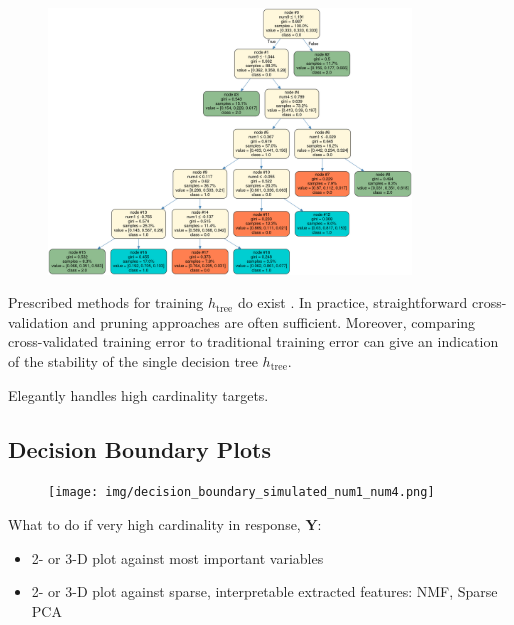 \documentclass{article}
\begin{document}
\begin{figure}[htb]
	\begin{center}
		\includegraphics[height=200pt]{img/simple_tree_prepruned_simulated.png}
		\caption{}
		\label{fig:surrogate_dt}
	\end{center}
\end{figure}

Prescribed methods for training $h_{\text{tree}}$ do exist \cite{dt_surrogate1} \cite{dt_surrogate2}. In practice, straightforward cross-validation and pruning approaches are often sufficient. Moreover, comparing cross-validated training error to traditional training error can give an indication of the stability of the single decision tree $h_{\text{tree}}$.

Elegantly handles high cardinality targets.

\subsection{Decision Boundary Plots}

\begin{figure}[htb]
	\begin{center}
		\texttt{[image: img/decision\_boundary\_simulated\_num1\_num4.png]}
		\caption{}
		\label{fig:global_db}
	\end{center}
\end{figure}

What to do if very high cardinality in response, $\mathbf{Y}$:

\begin{itemize}

\item 2- or 3-D plot against most important variables
\item 2- or 3-D plot against sparse, interpretable extracted features: NMF, Sparse PCA

\end{itemize}
\end{document}
